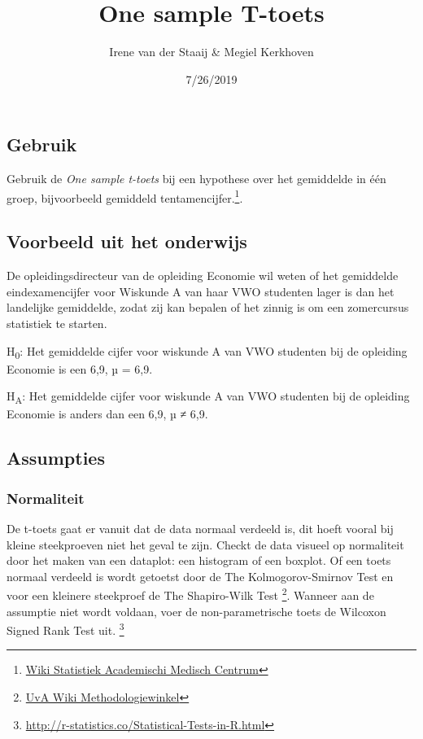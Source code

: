 \documentclass[]{article}
\title{One sample T-toets}
\author{Irene van der Staaij \& Megiel Kerkhoven}
\date{7/26/2019}
\let\rmarkdownfootnote\footnote%
\def\footnote{\protect\rmarkdownfootnote}
\begin{document}
\maketitle

\hypertarget{gebruik}{%
\subsection{Gebruik}\label{gebruik}}

Gebruik de \emph{One sample t-toets} bij een hypothese over het
gemiddelde in één groep, bijvoorbeeld gemiddeld
tentamencijfer.\footnote{\href{https://wikistatistiek.amc.nl/index.php/T-toets\#one_sample_t-toets}{Wiki
  Statistiek Academischi Medisch Centrum}}.

\hypertarget{voorbeeld-uit-het-onderwijs}{%
\subsection{Voorbeeld uit het
onderwijs}\label{voorbeeld-uit-het-onderwijs}}

De opleidingsdirecteur van de opleiding Economie wil weten of het
gemiddelde eindexamencijfer voor Wiskunde A van haar VWO studenten lager
is dan het landelijke gemiddelde, zodat zij kan bepalen of het zinnig is
om een zomercursus statistiek te starten.

H\textsubscript{0}: Het gemiddelde cijfer voor wiskunde A van VWO
studenten bij de opleiding Economie is een 6,9, µ = 6,9.

H\textsubscript{A}: Het gemiddelde cijfer voor wiskunde A van VWO
studenten bij de opleiding Economie is anders dan een 6,9, µ ≠ 6,9.

\hypertarget{assumpties}{%
\subsection{Assumpties}\label{assumpties}}

\hypertarget{normaliteit}{%
\subsubsection{Normaliteit}\label{normaliteit}}

De t-toets gaat er vanuit dat de data normaal verdeeld is, dit hoeft
vooral bij kleine steekproeven niet het geval te zijn. Checkt de data
visueel op normaliteit door het maken van een dataplot: een histogram of
een boxplot. Of een toets normaal verdeeld is wordt getoetst door de The
Kolmogorov-Smirnov Test en voor een kleinere steekproef de The
Shapiro-Wilk Test \footnote{\href{https://wiki.uva.nl/methodologiewinkel/index.php/Normaliteit}{UvA
  Wiki Methodologiewinkel}}. Wanneer aan de assumptie niet wordt
voldaan, voer de non-parametrische toets de Wilcoxon Signed Rank Test
uit. \footnote{\url{http://r-statistics.co/Statistical-Tests-in-R.html}}
\end{document}
